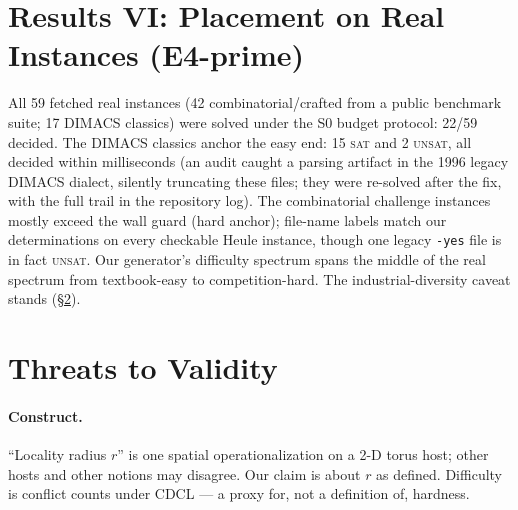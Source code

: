 \documentclass[manuscript, screen, review]{jair}
\begin{document}
\section{Results VI: Placement on Real Instances (E4-prime)}
\label{sec:e4}

All 59 fetched real instances (42 combinatorial/crafted from a public
benchmark suite; 17 DIMACS classics) were solved under the S0 budget protocol:
22/59 decided. The DIMACS classics anchor the easy end: 15 \textsc{sat} and 2
\textsc{unsat}, all decided within milliseconds (an audit caught a parsing
artifact in the 1996 legacy DIMACS dialect, silently truncating these files;
they were re-solved after the fix, with the full trail in the repository log).
The combinatorial challenge instances mostly exceed the wall guard (hard
anchor); file-name labels match our determinations on every checkable Heule
instance, though one legacy \texttt{-yes} file is in fact \textsc{unsat}. Our
generator's difficulty spectrum spans the middle of the real spectrum from
textbook-easy to competition-hard. The industrial-diversity caveat stands
(\S\ref{sec:threats}).

\section{Threats to Validity}
\label{sec:threats}

\paragraph{Construct.}
``Locality radius $r$'' is one spatial operationalization on a 2-D torus host;
other hosts and other notions may disagree. Our claim is about $r$ as defined.
Difficulty is conflict counts under CDCL --- a proxy for, not a definition of,
hardness.
\end{document}
